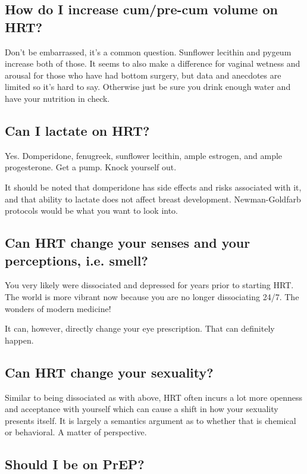 \documentclass{article}
\begin{document}
\subsection{How do I increase cum/pre-cum volume on HRT?}

Don’t be embarrassed, it’s a common question. Sunflower lecithin and pygeum increase both of those. It seems to also make a difference for vaginal wetness and arousal for those who have had bottom surgery, but data and anecdotes are limited so it’s hard to say. Otherwise just be sure you drink enough water and have your nutrition in check.

\subsection{Can I lactate on HRT?}

Yes. Domperidone, fenugreek, sunflower lecithin, ample estrogen, and ample progesterone. Get a pump. Knock yourself out.

It should be noted that domperidone has side effects and risks associated with it, and that ability to lactate does not affect breast development. Newman-Goldfarb protocols would be what you want to look into.

\subsection{Can HRT change your senses and your perceptions, i.e. smell?}

You very likely were dissociated and depressed for years prior to starting HRT. The world is more vibrant now because you are no longer dissociating 24/7. The wonders of modern medicine!

It can, however, directly change your eye prescription. That can definitely happen.

\subsection{Can HRT change your sexuality?}

Similar to being dissociated as with above, HRT often incurs a lot more openness and acceptance with yourself which can cause a shift in how your sexuality presents itself. It is largely a semantics argument as to whether that is chemical or behavioral. A matter of perspective. 

\subsection{Should I be on PrEP?}
\end{document}
